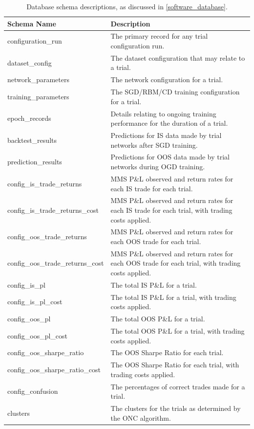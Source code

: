 \documentclass[a4paper,11pt,oneside]{article}
\theoremstyle{plain}
\theoremstyle{definition}
\begin{document}
	\begin{table}[H]
		\begin{tabular}{|p{0.33\linewidth}|p{0.67\linewidth}|}
			\hline
			\textbf{Schema Name} &\textbf{Description}  \\\hline	
			{configuration\_run} & {The primary record for any trial configuration run.} \\\hline
			{dataset\_config} & {The dataset configuration that may relate to a trial.} \\\hline
			{network\_parameters} & {The network configuration for a trial.} \\\hline
			{training\_parameters} & {The SGD/RBM/CD training configuration for a trial.}  \\\hline
			{epoch\_records} & {Details relating to ongoing training performance for the duration of a trial.}  \\\hline
			{backtest\_results} & {Predictions for IS data made by trial networks after SGD training.}  \\\hline
			{prediction\_results} & {Predictions for OOS data made by trial networks during OGD training.}  \\\hline
			{config\_is\_trade\_returns} & {MMS P\&L observed and return rates for each IS trade for each trial.}  \\\hline
			{config\_is\_trade\_returns\_cost} & {MMS P\&L observed and return rates for each IS trade for each trial, with trading costs applied.}  \\\hline
			{config\_oos\_trade\_returns} & {MMS P\&L observed and return rates for each OOS trade for each trial.}  \\\hline
			{config\_oos\_trade\_returns\_cost} & {MMS P\&L observed and return rates for each OOS trade for each trial, with trading costs applied.}  \\\hline
			{config\_is\_pl} & {The total IS P\&L for a trial.}  \\\hline
			{config\_is\_pl\_cost} & {The total IS P\&L for a trial, with trading costs applied.}  \\\hline
			{config\_oos\_pl} & {The total OOS P\&L for a trial.}  \\\hline
			{config\_oos\_pl\_cost} & {The total OOS P\&L for a trial, with trading costs applied.}  \\\hline
			{config\_oos\_sharpe\_ratio} & {The OOS Sharpe Ratio for each trial.}  \\\hline
			{config\_oos\_sharpe\_ratio\_cost} & {The OOS Sharpe Ratio for each trial, with trading costs applied.}  \\\hline			
			{config\_confusion} & {The percentages of correct trades made for a trial.}  \\\hline
			{clusters} & {The clusters for the trials as determined by the ONC algorithm.}  \\\hline
		\end{tabular}
		\newline\newline
		\caption{Database schema descriptions, as discussed in \ref{software_database}.}\label{tab_schemas}
	\end{table}
	
\end{document}
